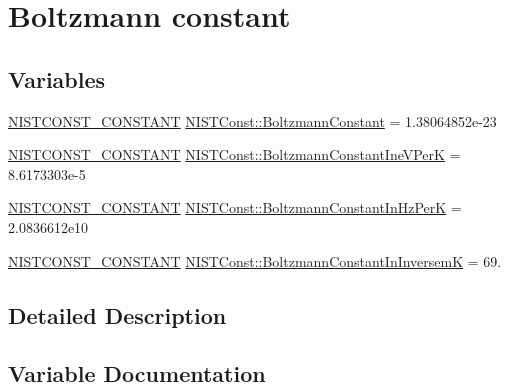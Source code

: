 \hypertarget{group___n_i_s_t_const-_boltzmann_constant}{}\section{Boltzmann constant}
\label{group___n_i_s_t_const-_boltzmann_constant}
\subsection*{Variables}
\begin{DoxyCompactItemize}
\item 
\mbox{\hyperlink{_n_i_s_t_const_8hpp_a2b0fc1d7452373f816175dd86ce26729}{N\+I\+S\+T\+C\+O\+N\+S\+T\+\_\+\+C\+O\+N\+S\+T\+A\+NT}} \mbox{\hyperlink{group___n_i_s_t_const-_boltzmann_constant_ga9a66c4988ef0f1d8298d0f43ccea6f1f}{N\+I\+S\+T\+Const\+::\+Boltzmann\+Constant}} = 1.\+38064852e-\/23
\item 
\mbox{\hyperlink{_n_i_s_t_const_8hpp_a2b0fc1d7452373f816175dd86ce26729}{N\+I\+S\+T\+C\+O\+N\+S\+T\+\_\+\+C\+O\+N\+S\+T\+A\+NT}} \mbox{\hyperlink{group___n_i_s_t_const-_boltzmann_constant_ga8c0cb1b4b0d54e1a5bf735efaef8d349}{N\+I\+S\+T\+Const\+::\+Boltzmann\+Constant\+Ine\+V\+PerK}} = 8.\+6173303e-\/5
\item 
\mbox{\hyperlink{_n_i_s_t_const_8hpp_a2b0fc1d7452373f816175dd86ce26729}{N\+I\+S\+T\+C\+O\+N\+S\+T\+\_\+\+C\+O\+N\+S\+T\+A\+NT}} \mbox{\hyperlink{group___n_i_s_t_const-_boltzmann_constant_gae7c3bd9c33c056465e2fe1e8e6f5bbd2}{N\+I\+S\+T\+Const\+::\+Boltzmann\+Constant\+In\+Hz\+PerK}} = 2.\+0836612e10
\item 
\mbox{\hyperlink{_n_i_s_t_const_8hpp_a2b0fc1d7452373f816175dd86ce26729}{N\+I\+S\+T\+C\+O\+N\+S\+T\+\_\+\+C\+O\+N\+S\+T\+A\+NT}} \mbox{\hyperlink{group___n_i_s_t_const-_boltzmann_constant_ga03a6526c1016d67e765abded43b37f36}{N\+I\+S\+T\+Const\+::\+Boltzmann\+Constant\+In\+InversemK}} = 69.
\end{DoxyCompactItemize}


\subsection{Detailed Description}


\subsection{Variable Documentation}
\mbox{\label{group___n_i_s_t_const-_boltzmann_constant_ga9a66c4988ef0f1d8298d0f43ccea6f1f}} 
